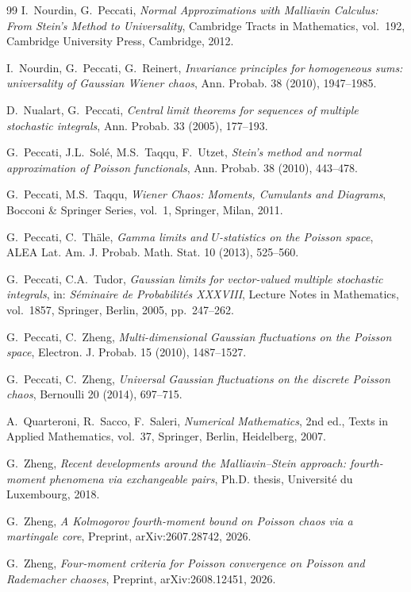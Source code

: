 \documentclass[letterpaper,11pt,reqno]{amsart}
\numberwithin{equation}{section}
\theoremstyle{plain}
\theoremstyle{definition}
\theoremstyle{remark}
\begin{document}
\begin{thebibliography}{99}
I.~Nourdin, G.~Peccati,
\emph{Normal Approximations with Malliavin Calculus:
From Stein's Method to Universality},
Cambridge Tracts in Mathematics, vol.~192,
Cambridge University Press, Cambridge, 2012.

I.~Nourdin, G.~Peccati, G.~Reinert,
\emph{Invariance principles for homogeneous sums: universality of
Gaussian Wiener chaos},
Ann. Probab. 38 (2010), 1947--1985.

D.~Nualart, G.~Peccati,
\emph{Central limit theorems for sequences of multiple stochastic
integrals},
Ann. Probab. 33 (2005), 177--193.

G.~Peccati, J.L.~Sol\'e, M.S.~Taqqu, F.~Utzet,
\emph{Stein's method and normal approximation of Poisson functionals},
Ann. Probab. 38 (2010), 443--478.

G.~Peccati, M.S.~Taqqu,
\emph{Wiener Chaos: Moments, Cumulants and Diagrams},
Bocconi \& Springer Series, vol.~1,
Springer, Milan, 2011.

G.~Peccati, C.~Th\"ale,
\emph{Gamma limits and $U$-statistics on the Poisson space},
ALEA Lat. Am. J. Probab. Math. Stat. 10 (2013), 525--560.

G.~Peccati, C.A.~Tudor,
\emph{Gaussian limits for vector-valued multiple stochastic
integrals},
in: \emph{S\'eminaire de Probabilit\'es XXXVIII},
Lecture Notes in Mathematics, vol.~1857,
Springer, Berlin, 2005, pp.~247--262.

G.~Peccati, C.~Zheng,
\emph{Multi-dimensional Gaussian fluctuations on the Poisson space},
Electron. J. Probab. 15 (2010), 1487--1527.

G.~Peccati, C.~Zheng,
\emph{Universal Gaussian fluctuations on the discrete Poisson chaos},
Bernoulli 20 (2014), 697--715.

A.~Quarteroni, R.~Sacco, F.~Saleri,
\emph{Numerical Mathematics},
2nd ed., Texts in Applied Mathematics, vol.~37,
Springer, Berlin, Heidelberg, 2007.


G.~Zheng,
\emph{Recent developments around the Malliavin--Stein approach:
fourth-moment phenomena via exchangeable pairs},
Ph.D. thesis, Universit\'e du Luxembourg, 2018.


G.~Zheng,
\emph{A Kolmogorov fourth-moment bound on Poisson chaos via a
martingale core},
Preprint, arXiv:2607.28742, 2026.


G.~Zheng,
\emph{Four-moment criteria for Poisson convergence
on Poisson and Rademacher chaoses},
Preprint, arXiv:2608.12451, 2026.

\end{thebibliography}
\end{document}

